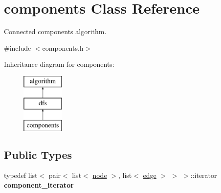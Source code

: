 \hypertarget{classcomponents}{}\section{components Class Reference}
\label{classcomponents}


Connected components algorithm.  




{\ttfamily \#include $<$components.\+h$>$}

Inheritance diagram for components\+:\begin{figure}[H]
\begin{center}
\leavevmode
\includegraphics[height=3.000000cm]{classcomponents}
\end{center}
\end{figure}
\subsection*{Public Types}
\begin{DoxyCompactItemize}
\item 
\mbox{\label{classcomponents_a5f9e3d26b8f7bc14b8f482754a38cb61}} 
typedef list$<$ pair$<$ list$<$ \mbox{\hyperlink{classnode}{node}} $>$, list$<$ \mbox{\hyperlink{classedge}{edge}} $>$ $>$ $>$\+::iterator {\bfseries component\+\_\+iterator}
\end{DoxyCompactItemize}
